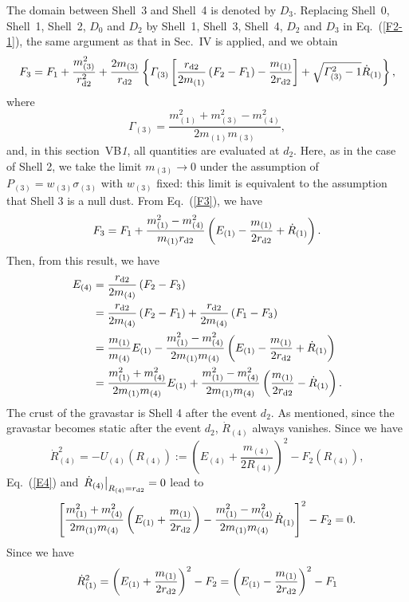 \documentclass[aps,preprint,preprintnumber,nofootinbib,amsmath,amssymb,ascmac,bm,12pt]{revtex4}
\newcommand{\rdt}{r_{\rm d2}}
\newcommand{\mo}{m_{(1)}}
\newcommand{\mth}{m_{(3)}}
\newcommand{\mf}{m_{(4)}}
\newcommand{\Rtw}{R_{(2)}}
\newcommand{\Rfo}{R_{(4)}}
\newcommand{\Eon}{E_{(1)}}
\newcommand{\Efo}{E_{(4)}}
\begin{document}
The domain between Shell~3 and Shell~4 is denoted by $D_3$. 
Replacing Shell~0, Shell~1, Shell~2, $D_0$ and $D_2$ 
by Shell~1, Shell~3, Shell~4, $D_2$ and $D_3$  in Eq.~(\ref{F2-1}), 
the same argument as that in Sec.~IV 
is applied, and we obtain
\begin{equation}
F_3=F_1
+\frac{\mth^2}{\rdt^2}+\frac{2\mth}{\rdt}\left\{\varGamma_{(3)}\left[\frac{\rdt}{2\mo}
\left(F_2-F_1\right)
-\frac{\mo}{2\rdt}\right]+\sqrt{\varGamma_{(3)}^2-1}\dot{R}_{(1)}\right\}, \label{F3}
\end{equation}
where 
$$
\varGamma_{(3)}=\frac{\mo^2+\mth^2-\mf^2}{2\mo\mth}, 
$$
and, in this section~VB{\it 1}, all quantities are evaluated  at $d_2$. 
Here, as in the case of Shell 2, we take the limit $\mth\rightarrow0$ 
under the assumption of $P_{(3)}=w_{(3)}\sigma_{(3)}$ with $w_{(3)}$ fixed: this limit is 
equivalent to the assumption that Shell 3 is a null dust. From Eq.~(\ref{F3}), we have
$$
F_3 =F_1+\frac{\mo^2-\mf^2}{\mo\rdt}\left(\Eon-\frac{\mo}{2\rdt}+\dot{R}_{(1)}\right).
$$
Then, from this result, we have
\begin{align}
\Efo&=\frac{\rdt}{2\mf}\left(F_2-F_3\right) \nonumber \\
&=\frac{\rdt}{2\mf}\left(F_2-F_1\right)+\frac{\rdt}{2\mf}\left(F_1-F_3\right) \nonumber \\
&=\frac{\mo}{\mf}\Eon-\frac{\mo^2-\mf^2}{2\mo\mf}\left(\Eon-\frac{\mo}{2\rdt}+\dot{R}_{(1)}\right) \nonumber \\
&=\frac{\mo^2+\mf^2}{2\mo\mf}\Eon
+\frac{\mo^2-\mf^2}{2\mo\mf}\left(\frac{\mo}{2\rdt}-\dot{R}_{(1)}\right). \label{E4}
\end{align}
The crust of the gravastar is Shell 4 after the event $d_2$.  
As mentioned, since the gravastar becomes static after the event $d_2$, $\dot{R}_{(4)}$ always vanishes. 
Since we have
$$
\dot{R}_{(4)}^2=-U_{(4)}\left(\Rfo\right):=\left(\Efo+\frac{\mf}{2\Rfo}\right)^2-F_2\left(\Rfo\right), 
$$
Eq.~(\ref{E4}) and $\left. \dot{R}_{(4)}\right|_{\Rfo=\rdt}=0$ lead to 
\begin{equation}
\left[\frac{\mo^2+\mf^2}{2\mo\mf}\left(\Eon+\frac{\mo}{2\rdt}\right)
-\frac{\mo^2-\mf^2}{2\mo\mf}\dot{R}_{(1)}\right]^2-F_2=0. \label{static1}
\end{equation}
Since we have 
\begin{equation}
\dot{R}_{(1)}^2=\left(\Eon+\dfrac{\mo}{2\rdt}\right)^2-F_2=\left(\Eon-\dfrac{\mo}{2\rdt}\right)^2-F_1 \label{R1-2}
\end{equation}
\end{document}

